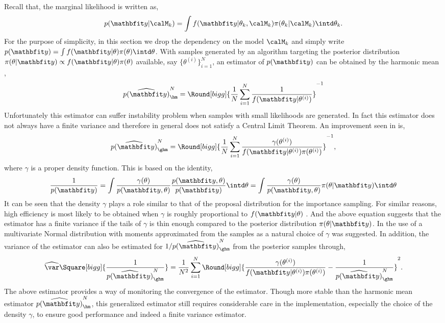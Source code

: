 Recall that, the marginal likelihood is written as,
\begin{equation*}
  p(\data|\calM_k) = \int
  f(\data|\theta_k,\calM_k)\pi(\theta_k|\calM_k)\intd\theta_k.
\end{equation*}
For the purpose of simplicity, in this section we drop the dependency on the
model $\calM_k$ and simply write $p(\data) = \int
f(\data|\theta)\pi(\theta)\intd\theta$. With samples generated by an \mcmc
algorithm targeting the posterior distribution $\pi(\theta|\data) \propto
f(\data|\theta) \pi(\theta)$ available, say $\{\theta^{(i)}\}_{i=1}^N$, an
estimator of $p(\data)$ can be obtained by the harmonic mean
\cite{Newton:1994wm},
\begin{equation}
  \widehat{p(\data)}_{\hm}^N =
  \Round[bigg]{\frac{1}{N}\sum_{i=1}^N\frac{1}{f(\data|\theta^{(i)})}}^{-1}
\end{equation}
Unfortunately this estimator can suffer instability problem when samples with
small likelihoods are generated. In fact this estimator does not always have a
finite variance and therefore in general does not satisfy a Central Limit
Theorem. An improvement seen in \cite{Kass:1995vb} is,
\begin{equation}
  \widehat{p(\data)}_{\ghm}^N = \Round[bigg]{
    \frac{1}{N}\sum_{i=1}^N
    \frac{\gamma(\theta^{(i)})}{f(\data|\theta^{(i)})\pi(\theta^{(i)})}}^{-1},
\end{equation}
where $\gamma$ is a proper density function. This is based on the identity,
\begin{equation}
  \frac{1}{p(\data)}
  = \int \frac{\gamma(\theta)}{p(\data,\theta)}
  \frac{p(\data,\theta)}{p(\data)} \intd \theta
  = \int \frac{\gamma(\theta)}{p(\data,\theta)} \pi(\theta|\data) \intd \theta
\end{equation}
It can be seen that the density $\gamma$ plays a role similar to that of the
proposal distribution for the importance sampling. For similar reasons, high
efficiency is most likely to be obtained when $\gamma$ is roughly proportional
to $f(\data|\theta)$ \cite{Kass:1995vb}. And the above equation suggests that
the estimator has a finite variance if the tails of $\gamma$ is thin enough
compared to the posterior distribution $\pi(\theta|\data)$. In
\cite{Gelfand:1994ux} the use of a multivariate Normal distribution with
moments approximated from the samples as a natural choice of $\gamma$ was
suggested. In addition, the variance of the estimator can also be estimated
for $1/\widehat{p(\data)}_{\ghm}^N$ from the posterior samples through,
\begin{equation}
  \widehat\var\Square[bigg]{\frac{1}{\widehat{p(\data)}_{\ghm}^N}} =
  \frac{1}{N^2}\sum_{i=1}^N \Round[bigg]{
    \frac{\gamma(\theta^{(i)})}{f(\data|\theta^{(i)})\pi(\theta^{(i)})}
    - \frac{1}{\widehat{p(\data)}_{\ghm}^N}}^2.
\end{equation}
The above estimator provides a way of monitoring the convergence of the
estimator. Though more stable than the harmonic mean estimator
$\widehat{p(\data)}_{\hm}^N$, this generalized estimator still requires
considerable care in the implementation, especially the choice of the density
$\gamma$, to ensure good performance and indeed a finite variance estimator.

